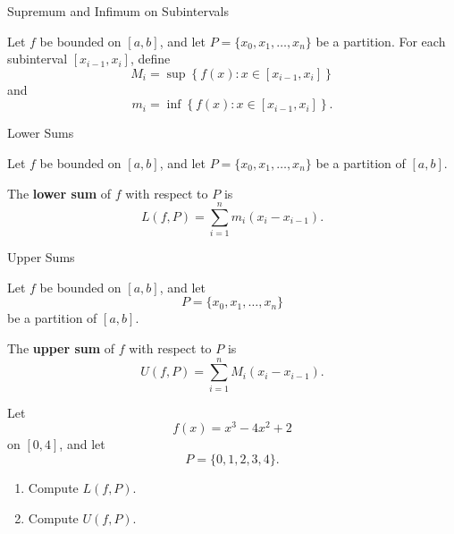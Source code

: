 \documentclass[12pt,a4paper]{article}
\begin{document}
\clearpage

\begin{heading}
Supremum and Infimum on Subintervals
\end{heading}


\begin{definition}
Let $f$ be bounded on $[a,b]$, and let
\(
P=\{x_0,x_1,\dots,x_n\}
\)
be a partition. For each subinterval $[x_{i-1},x_i]$, define
\[
M_i
=
\sup
\left\{
f(x):x\in[x_{i-1},x_i]
\right\}
\]
and
\[
m_i
=
\inf
\left\{
f(x):x\in[x_{i-1},x_i]
\right\}.
\]
\end{definition}


\clearpage

\begin{heading}
Lower Sums
\end{heading}

\begin{definition}
Let $f$ be bounded on $[a,b]$, and let
\(
P=\{x_0,x_1,\dots,x_n\}
\)
be a partition of $[a,b]$.

The \textbf{lower sum} of $f$ with respect to $P$ is
\[
L(f,P)
=
\sum_{i=1}^{n}
m_i(x_i-x_{i-1}).
\]
\end{definition}



\clearpage

\begin{heading}
Upper Sums
\end{heading}

\begin{definition}
Let $f$ be bounded on $[a,b]$, and let
\[
P=\{x_0,x_1,\dots,x_n\}
\]
be a partition of $[a,b]$.

The \textbf{upper sum} of $f$ with respect to $P$ is
\[
U(f,P)
=
\sum_{i=1}^{n}
M_i(x_i-x_{i-1}).
\]
\end{definition}

\clearpage

\begin{problem}
Let
\[
f(x)=x^{3}-4x^{2}+2
\]
on $[0,4]$, and let
\[
P=\{0,1,2,3,4\}.
\]

\begin{enumerate}
    \item Compute
    \(
    L(f,P).
    \)

    \item Compute
    \(
    U(f,P).
    \)
\end{enumerate}
\end{problem}
\end{document}
